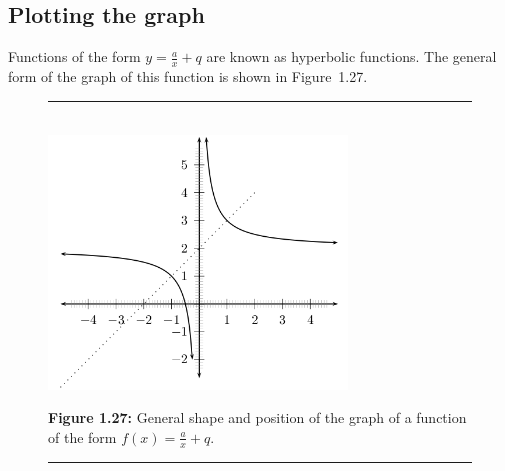 \subsection*{Plotting the graph}           
Functions of the form $y=\frac{a}{x}+q$ are known as hyperbolic functions. The general form of the graph of this function is shown in Figure~1.27.\par 
\setcounter{subfigure}{0}
\begin{figure}[H] %
\begin{center}
\rule[.1in]{\figurerulewidth}{.005in} \\
\label{m39341*uid138!!!underscore!!!media}\label{m39341*uid138!!!underscore!!!printimage}\includegraphics[width=300px]{col11306.imgs/m39341_MG10C11_021.png} %
\vspace{2pt}
\vspace{\rubberspace}\par \begin{cnxcaption}
\small \textbf{Figure 1.27: }General shape and position of the graph of a function of the form $f(x)=\frac{a}{x}+q$.
\end{cnxcaption}
\vspace{.1in}
\rule[.1in]{\figurerulewidth}{.005in} \\
\end{center}
\end{figure}       

